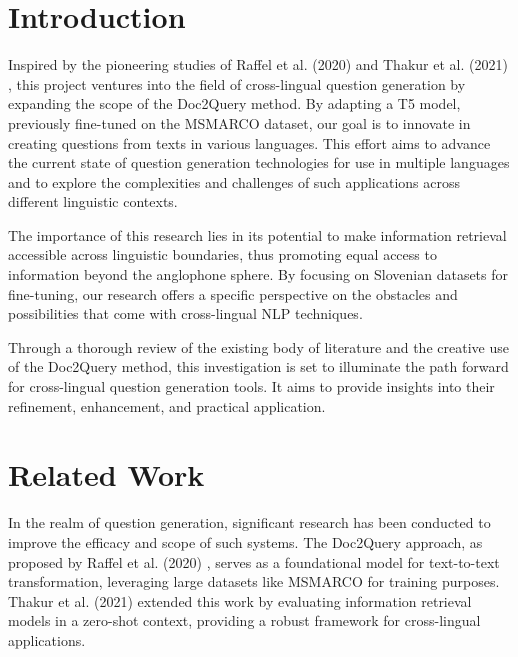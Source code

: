 \documentclass[fleqn,moreauthors,10pt]{ds_report}
\affiliation{\textit{Advisors: Boshko}}
\begin{document}
\flushbottom 

\maketitle 

\thispagestyle{empty} 


\section*{Introduction}
Inspired by the pioneering studies of Raffel et al. (2020) \cite{raffel2020exploring} and Thakur et al. (2021) \cite{thakur2021beir}, this project ventures into the field of cross-lingual question generation by expanding the scope of the Doc2Query method. By adapting a T5 model, previously fine-tuned on the MSMARCO dataset, our goal is to innovate in creating questions from texts in various languages. This effort aims to advance the current state of question generation technologies for use in multiple languages and to explore the complexities and challenges of such applications across different linguistic contexts.

The importance of this research lies in its potential to make information retrieval accessible across linguistic boundaries, thus promoting equal access to information beyond the anglophone sphere. By focusing on Slovenian datasets for fine-tuning, our research offers a specific perspective on the obstacles and possibilities that come with cross-lingual NLP techniques.

Through a thorough review of the existing body of literature and the creative use of the Doc2Query method, this investigation is set to illuminate the path forward for cross-lingual question generation tools. It aims to provide insights into their refinement, enhancement, and practical application.



\section*{Related Work}
In the realm of question generation, significant research has been conducted to improve the efficacy and scope of such systems. The Doc2Query approach, as proposed by Raffel et al. (2020) \cite{raffel2020exploring}, serves as a foundational model for text-to-text transformation, leveraging large datasets like MSMARCO for training purposes. Thakur et al. (2021) \cite{thakur2021beir} extended this work by evaluating information retrieval models in a zero-shot context, providing a robust framework for cross-lingual applications.
\end{document}
